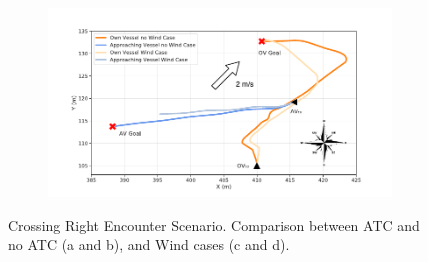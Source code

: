         \begin{figure}[H]
        \centering
        
            
            \begin{subfigure}[b]{0.49\textwidth}
                \centering
                \includegraphics[width=\textwidth]{figs/Chap5/plot_cr_w_vs_wind.pdf}
                \caption{}
                \label{fig:plot_cr_w_vs_wind}
            \end{subfigure}
            \begin{subfigure}[b]{0.49\textwidth}
                \centering
                
                \caption{}
                \label{fig:plot_cr_w_vs_wind_CT}
            \end{subfigure}
        
        \caption{Crossing Right Encounter Scenario. Comparison between \ac{ATC} and no \ac{ATC} (a and b), and Wind cases (c and d).}
        \label{fig:plots_cr}
        \end{figure}
        
